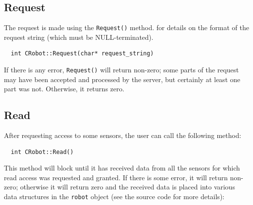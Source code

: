 \documentclass[11pt]{article}
\begin{document}
\subsection{Request}

The request is made using the {\tt Request()}
method. 
for details on the format of the request string (which must be
NULL-terminated).
\begin{verbatim}
  int CRobot::Request(char* request_string)
\end{verbatim}

If there is any error, {\tt Request()} will return non-zero;
some parts of the request may have been accepted and processed
by the server, but certainly at
least one part was not.  Otherwise, it returns zero.


\subsection{Read}

After requesting access to some sensors, the user can call the following
method:

\begin{verbatim}
  int CRobot::Read()
\end{verbatim}

This method will block until it has received data from all the sensors
for which read access was requested and granted.  If there
is some error, it will return non-zero; otherwise it will
return zero and the received data is placed
into various data structures in the {\tt robot} object (see the source
code for more details):
\end{document}
